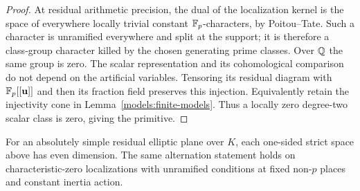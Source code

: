 \begin{proof}
At residual arithmetic precision, the dual of the localization
kernel is the space of everywhere locally trivial constant
$\mathbb F_p$-characters, by Poitou--Tate.  Such a character is unramified
everywhere and split at the support; it is therefore a class-group
character killed by the chosen generating prime classes.  Over
$\mathbb Q$ the same group is zero.  The scalar representation and its
cohomological comparison do not depend on the artificial variables.
Tensoring its residual diagram with $\mathbb F_p[[\mathbf u]]$ and then
its fraction field preserves this injection.  Equivalently retain
the injectivity cone in Lemma~\ref{models:finite-models}.  Thus a
locally zero degree-two scalar class is zero, giving the primitive.
\end{proof}

\begin{lemma}\label{vertical:parity}
For an absolutely simple residual elliptic plane over $K$, each
one-sided strict space above has even dimension.  The same
alternation statement holds on characteristic-zero localizations
with unramified conditions at fixed non-$p$ places and constant
inertia action.
\end{lemma}

